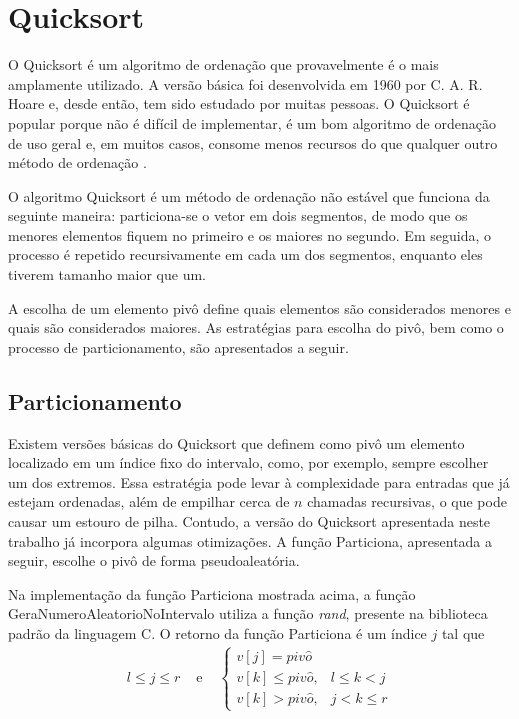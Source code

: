 \section{Quicksort}
O Quicksort é um algoritmo de ordenação que provavelmente é o mais amplamente utilizado. A versão básica foi desenvolvida em 1960 por C. A. R. Hoare e, desde então, tem sido estudado por muitas pessoas. O Quicksort é popular porque não é difícil de implementar, é um bom algoritmo de ordenação de uso geral e, em muitos casos, consome menos recursos do que qualquer outro método de ordenação \cite[p.115, tradução nossa]{book:58781}.

O algoritmo Quicksort é um método de ordenação não estável que funciona da seguinte maneira: particiona-se o vetor em dois segmentos, de modo que os menores elementos fiquem no primeiro e os maiores no segundo. Em seguida, o processo é repetido recursivamente em cada um dos segmentos, enquanto eles tiverem tamanho maior que um.

A escolha de um elemento pivô define quais elementos são considerados menores e quais são considerados maiores. As estratégias para escolha do pivô, bem como o processo de particionamento, são apresentados a seguir.

\subsection*{Particionamento}
Existem versões básicas do Quicksort que definem como pivô um elemento localizado em um índice fixo do intervalo, como, por exemplo, sempre escolher um dos extremos. Essa estratégia pode levar à complexidade  para entradas que já estejam ordenadas, além de empilhar cerca de $n$ chamadas recursivas, o que pode causar um estouro de pilha. Contudo, a versão do Quicksort apresentada neste trabalho já incorpora algumas otimizações. A função Particiona, apresentada a seguir, escolhe o pivô de forma pseudoaleatória.



Na implementação da função Particiona mostrada acima, a função GeraNumeroAleatorioNoIntervalo utiliza a função \textit{rand}, presente na biblioteca padrão da linguagem C. O retorno da função Particiona é um índice $j$ tal que
\[
\begin{array}{ccc}
    l \leq j \leq r & \text{ e } & 
    \begin{cases}
        v[j] = piv\hat{o}\\
        v[k] \leq piv\hat{o}, & l \leq k < j \\
        v[k] > piv\hat{o}, & j < k \leq r
    \end{cases}
\end{array}
\]

